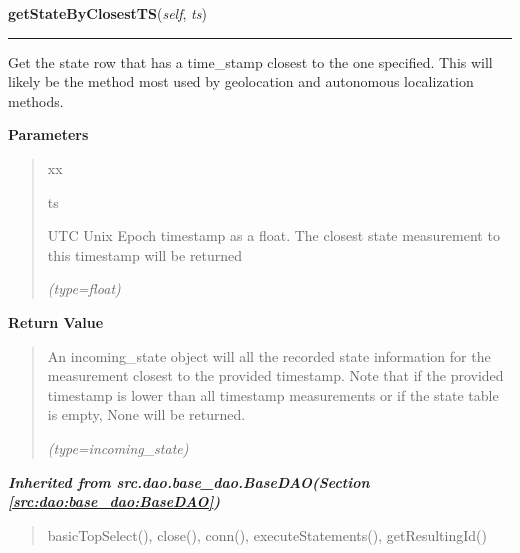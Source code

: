 \hspace{.8\funcindent}\begin{boxedminipage}{\funcwidth}

    \raggedright \textbf{getStateByClosestTS}(\textit{self}, \textit{ts})

    \vspace{-1.5ex}

    \rule{\textwidth}{0.5\fboxrule}
\setlength{\parskip}{2ex}
    Get the state row that has a time\_stamp closest to the one specified. 
    This will likely be the method most used by geolocation and autonomous 
    localization methods.

\setlength{\parskip}{1ex}
      \textbf{Parameters}
      \vspace{-1ex}

      \begin{quote}
        \begin{Ventry}{xx}

          \item[ts]

          UTC Unix Epoch timestamp as a float. The closest state 
          measurement to this timestamp will be returned

            {\it (type=float)}

        \end{Ventry}

      \end{quote}

      \textbf{Return Value}
    \vspace{-1ex}

      \begin{quote}
      An incoming\_state object will all the recorded state information for
      the measurement closest to the provided timestamp. Note that if the 
      provided timestamp is lower than all timestamp measurements or if the
      state table is empty, None will be returned.

      {\it (type=incoming\_state)}

      \end{quote}

    \end{boxedminipage}


\large{\textbf{\textit{Inherited from src.dao.base\_dao.BaseDAO\textit{(Section \ref{src:dao:base_dao:BaseDAO})}}}}

\begin{quote}
basicTopSelect(), close(), conn(), executeStatements(), getResultingId()
\end{quote}

